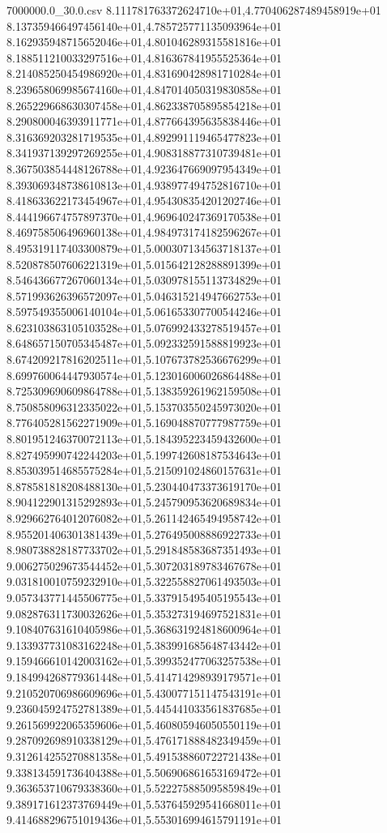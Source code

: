 \begin{filecontents*}{7000000.0_30.0.csv}
8.111781763372624710e+01,4.770406287489458919e+01
8.137359466497456140e+01,4.785725771135093964e+01
8.162935948715652046e+01,4.801046289315581816e+01
8.188511210033297516e+01,4.816367841955525364e+01
8.214085250454986920e+01,4.831690428981710284e+01
8.239658069985674160e+01,4.847014050319830858e+01
8.265229668630307458e+01,4.862338705895854218e+01
8.290800046393911771e+01,4.877664395635838446e+01
8.316369203281719535e+01,4.892991119465477823e+01
8.341937139297269255e+01,4.908318877310739481e+01
8.367503854448126788e+01,4.923647669097954349e+01
8.393069348738610813e+01,4.938977494752816710e+01
8.418633622173454967e+01,4.954308354201202746e+01
8.444196674757897370e+01,4.969640247369170538e+01
8.469758506496960138e+01,4.984973174182596267e+01
8.495319117403300879e+01,5.000307134563718137e+01
8.520878507606221319e+01,5.015642128288891399e+01
8.546436677267060134e+01,5.030978155113734829e+01
8.571993626396572097e+01,5.046315214947662753e+01
8.597549355006140104e+01,5.061653307700544246e+01
8.623103863105103528e+01,5.076992433278519457e+01
8.648657150705345487e+01,5.092332591588819923e+01
8.674209217816202511e+01,5.107673782536676299e+01
8.699760064447930574e+01,5.123016006026864488e+01
8.725309690609864788e+01,5.138359261962159508e+01
8.750858096312335022e+01,5.153703550245973020e+01
8.776405281562271909e+01,5.169048870777987759e+01
8.801951246370072113e+01,5.184395223459432600e+01
8.827495990742244203e+01,5.199742608187534643e+01
8.853039514685575284e+01,5.215091024860157631e+01
8.878581818208488130e+01,5.230440473373619170e+01
8.904122901315292893e+01,5.245790953620689834e+01
8.929662764012076082e+01,5.261142465494958742e+01
8.955201406301381439e+01,5.276495008886922733e+01
8.980738828187733702e+01,5.291848583687351493e+01
9.006275029673544452e+01,5.307203189783467678e+01
9.031810010759232910e+01,5.322558827061493503e+01
9.057343771445506775e+01,5.337915495405195543e+01
9.082876311730032626e+01,5.353273194697521831e+01
9.108407631610405986e+01,5.368631924818600964e+01
9.133937731083162248e+01,5.383991685648743442e+01
9.159466610142003162e+01,5.399352477063257538e+01
9.184994268779361448e+01,5.414714298939179571e+01
9.210520706986609696e+01,5.430077151147543191e+01
9.236045924752781389e+01,5.445441033561837685e+01
9.261569922065359606e+01,5.460805946050550119e+01
9.287092698910338129e+01,5.476171888482349459e+01
9.312614255270881358e+01,5.491538860722721438e+01
9.338134591736404388e+01,5.506906861653169472e+01
9.363653710679338360e+01,5.522275885095859849e+01
9.389171612373769449e+01,5.537645929541668011e+01
9.414688296751019436e+01,5.553016994615791191e+01

\end{filecontents*}
